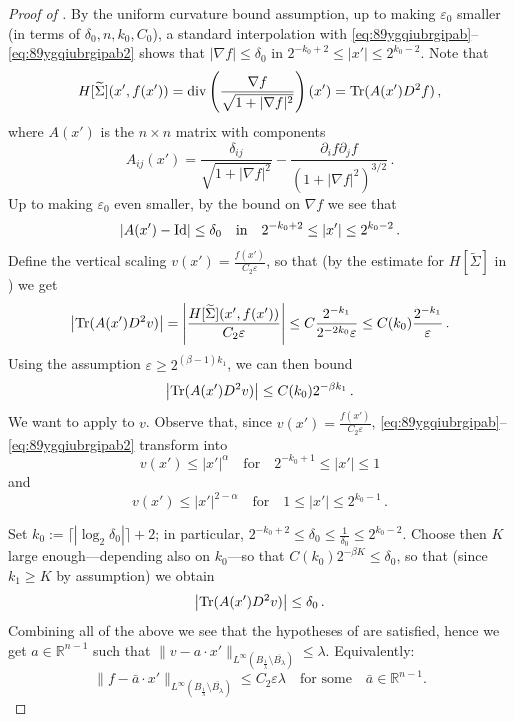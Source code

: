\documentclass{article}
\newcommand{\R}{\mathbb{R}}
\newcommand{\ep}{\varepsilon}
\theoremstyle{definition}
\begin{document}
\begin{proof}[Proof of ]
By the uniform curvature bound assumption, up to making $\ep_0$ smaller (in terms of $\delta_0,n,k_0,C_0$), a standard interpolation with \eqref{eq:89ygqiubrgipab}--\eqref{eq:89ygqiubrgipab2} shows that $|\nabla f|\leq \delta_0$ in $2^{-k_0+2}\leq|x'|\leq 2^{k_0-2}$. Note that
$$H[\widetilde \Sigma](x',f(x'))={\rm div}\left(\frac{\nabla f}{\sqrt{1+|\nabla f|^2}}\right)(x')={\rm Tr}(A(x')D^2f)\,,$$
where $A(x')$ is the $n\times n$ matrix with components
$$A_{ij}(x')=\frac{\delta_{ij}}{\sqrt{1+|\nabla f|^2}}-\frac{\partial_i f \partial_j f}{(1+|\nabla f|^2)^{3/2}}\,.$$
Up to making $\ep_0$ even smaller, by the bound on $\nabla f$ we see that
$$|A(x')-{\rm Id}|\leq\delta_0 \quad\mbox{in}\quad 2^{-k_0+2}\leq|x'|\leq 2^{k_0-2}\,.$$
Define the vertical scaling $v(x')=\frac{f(x')}{C_2\ep}$, so that (by the estimate for $H[\widetilde \Sigma]$ in ) we get
$$\left|{\rm Tr}(A(x')D^2v)\right|=\left|\frac{H[\widetilde \Sigma](x',f(x'))}{C_2\ep}\right|\leq C\frac{2^{-k_1}}{2^{-2 k_0}\ep}\leq C(k_0)\frac{2^{-k_1}}{\ep}\,.$$
Using the assumption $\ep\geq 2^{(\beta-1) k_1}$, we can then bound $$\left|{\rm Tr}(A(x')D^2v)\right|\leq C(k_0)2^{-\beta k_1}\,.$$
We want to apply  to $v$. Observe that, since $v(x')=\frac{f(x')}{C_2\ep}$, \eqref{eq:89ygqiubrgipab}--\eqref{eq:89ygqiubrgipab2} transform into
\begin{equation}\label{eq:89ygqiubrgipabv}
    v(x')\leq |x'|^{\alpha}\quad\mbox{for}\quad 2^{-k_0+1}\leq|x'|\leq 1
\end{equation}
and
\begin{equation}\label{eq:89ygqiubrgipab2v}
    v(x')\leq |x'|^{2-\alpha}\quad\mbox{for}\quad 1\leq|x'|\leq 2^{k_0-1}\,.
\end{equation}

Set $k_0:=\lceil|\log_2 \delta_0|\rceil+2$; in particular, $2^{-k_0+2}\leq \delta_0\leq \frac{1}{\delta_0}\leq 2^{k_0-2}$. Choose then $K$ large enough---depending also on $k_0$---so that $C(k_0)2^{-\beta K}\leq \delta_0$, so that (since $k_1\geq K$ by assumption) we obtain
\begin{equation}\label{eq:67fhablsa}
    \left|{\rm Tr}(A(x')D^2v)\right|\leq \delta_0\,.
\end{equation}
Combining all of the above we see that the hypotheses of  are satisfied, hence we get $a\in\R^{n-1}$ such that $\|v-a\cdot x'\|_{L^\infty(B_{\frac{1}{\lambda}}\setminus \overline{B_{\lambda}})
}\leq \lambda$. Equivalently:
\begin{equation}\label{eq:14t8ggabg}
    \|f-\bar a\cdot x'\|_{L^\infty(B_{\frac{1}{\lambda}}\setminus \overline{B_{\lambda}})
}\leq C_2\ep\lambda\quad\mbox{for some}\quad \bar a\in\R^{n-1}.
\end{equation}



\end{proof}
\end{document}
